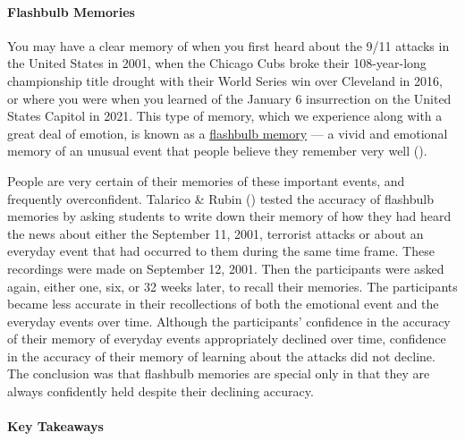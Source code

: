 \documentclass[
]{krantz}
\begin{document}
\paragraph*{Flashbulb Memories}\label{flashbulb-memories}

You may have a clear memory of when you first heard about the 9/11 attacks in the United States in 2001, when the Chicago Cubs broke their 108-year-long championship title drought with their World Series win over Cleveland in 2016, or where you were when you learned of the January 6 insurrection on the United States Capitol in 2021. This type of memory, which we experience along with a great deal of emotion, is known as a \hyperref[flashbulb-memory]{flashbulb memory} --- a vivid and emotional memory of an unusual event that people believe they remember very well ().

People are very certain of their memories of these important events, and frequently overconfident. Talarico \& Rubin () tested the accuracy of flashbulb memories by asking students to write down their memory of how they had heard the news about either the September 11, 2001, terrorist attacks or about an everyday event that had occurred to them during the same time frame. These recordings were made on September 12, 2001. Then the participants were asked again, either one, six, or 32 weeks later, to recall their memories. The participants became less accurate in their recollections of both the emotional event and the everyday events over time. Although the participants' confidence in the accuracy of their memory of everyday events appropriately declined over time, confidence in the accuracy of their memory of learning about the attacks did not decline. The conclusion was that flashbulb memories are special only in that they are always confidently held despite their declining accuracy.

\paragraph*{Key Takeaways}\label{key-takeaways-5}
\end{document}
